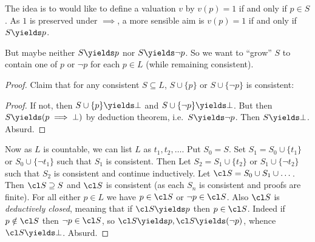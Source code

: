 \documentclass[a4paper]{article}
\begin{document}
The idea is to would like to define a valuation \(v\) by \(v(p) = 1\) if and only if \(p \in S\). As \(1\) is preserved under \(\implies\), a more sensible aim is \(v(p) = 1\) if and only if \(S \yields p\).

But maybe neither \(S \yields p\) nor \(S \yields \neg p\). So we want to ``grow'' \(S\) to contain one of \(p\) or \(\neg p\) for each \(p \in L\) (while remaining consistent).

\begin{proof}
  Claim that for any consistent \(S \subseteq L\), \(S \cup \{p\}\) or \(S \cup \{\neg p\}\) is consistent:

  \begin{proof}
    If not, then \(S \cup \{p\} \yields \bot\) and \(S \cup \{\neg p\} \yields \bot\). But then \(S \yields (p \implies \bot)\) by deduction theorem, i.e.\ \(S \yields \neg p\). Then \(S \yields \bot\). Absurd.
  \end{proof}

  Now as \(L\) is countable, we can list \(L\) as \(t_1, t_2, \dots \). Put \(S_0 = S\). Set \(S_1 = S_0 \cup \{t_1\}\) or \(S_0 \cup \{\neg t_1\}\) such that \(S_1\) is consistent. Then Let \(S_2 = S_1 \cup \{t_2\}\) or \(S_1 \cup \{\neg t_2\}\) such that \(S_2\) is consistent and continue inductively. Let \(\cl S = S_0 \cup S_1 \cup \dots\). Then \(\cl S \supseteq S\) and \(\cl S\) is consistent (as each \(S_n\) is consistent and proofs are finite). For all either \(p \in L\) we have \(p \in \cl S\) or \(\neg p \in \cl S\). Also \(\cl S\) is \emph{deductively closed}, meaning that if \(\cl S \yields p\) then \(p \in \cl S\). Indeed if \(p \notin \cl S\) then \(\neg p \in \cl S\), so \(\cl S \yields p, \cl S \yields (\neg p)\), whence \(\cl S \yields \bot\). Absurd.


\end{proof}
\end{document}
